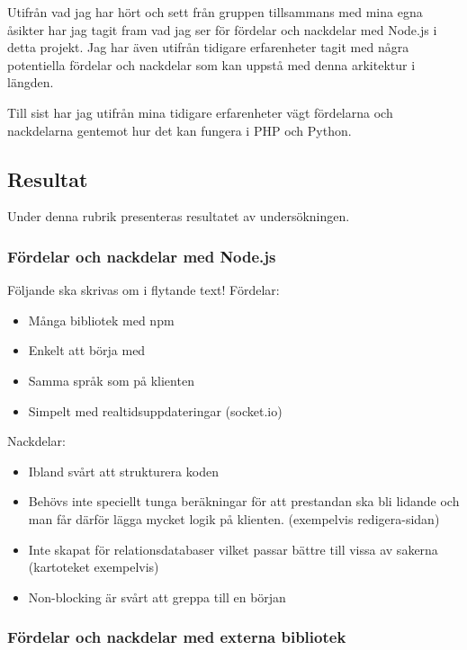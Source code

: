 Utifrån vad jag har hört och sett från gruppen tillsammans med mina egna åsikter har jag tagit fram vad jag ser för fördelar och nackdelar med Node.js i detta projekt. Jag har även utifrån tidigare erfarenheter tagit med några potentiella fördelar och nackdelar som kan uppstå med denna arkitektur i längden.

Till sist har jag utifrån mina tidigare erfarenheter vägt fördelarna och nackdelarna gentemot hur det kan fungera i PHP och Python. 


\subsection{Resultat}

Under denna rubrik presenteras resultatet av undersökningen. 

\subsubsection{Fördelar och nackdelar med Node.js}

Följande ska skrivas om i flytande text!
Fördelar:
\begin{itemize}
	\item Många bibliotek med npm
	\item Enkelt att börja med
	\item Samma språk som på klienten
	\item Simpelt med realtidsuppdateringar (socket.io)
\end{itemize}
Nackdelar:
\begin{itemize}
	\item Ibland svårt att strukturera koden
	\item Behövs inte speciellt tunga beräkningar för att prestandan ska bli lidande och man får därför lägga mycket logik på klienten. (exempelvis redigera-sidan)
	\item Inte skapat för relationsdatabaser vilket passar bättre till vissa av sakerna (kartoteket exempelvis)
	\item Non-blocking är svårt att greppa till en början
\end{itemize}

\subsubsection{Fördelar och nackdelar med externa bibliotek}


